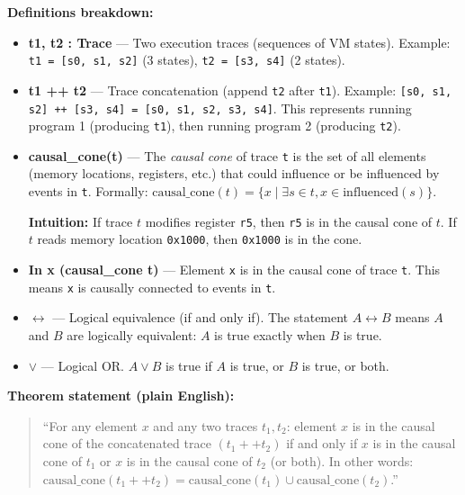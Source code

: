 \textbf{Definitions breakdown:}
\begin{itemize}
    \item \textbf{t1, t2 : Trace} — Two execution traces (sequences of VM states). Example: \texttt{t1 = [s0, s1, s2]} (3 states), \texttt{t2 = [s3, s4]} (2 states).
    
    \item \textbf{t1 ++ t2} — Trace concatenation (append \texttt{t2} after \texttt{t1}). Example: \texttt{[s0, s1, s2] ++ [s3, s4] = [s0, s1, s2, s3, s4]}. This represents running program 1 (producing \texttt{t1}), then running program 2 (producing \texttt{t2}).
    
    \item \textbf{causal\_cone(t)} — The \textit{causal cone} of trace \texttt{t} is the set of all elements (memory locations, registers, etc.) that could influence or be influenced by events in \texttt{t}. Formally: $\text{causal\_cone}(t) = \{x \mid \exists s \in t, x \in \text{influenced}(s)\}$.
    
    \textbf{Intuition:} If trace $t$ modifies register \texttt{r5}, then \texttt{r5} is in the causal cone of $t$. If $t$ reads memory location \texttt{0x1000}, then \texttt{0x1000} is in the cone.
    
    \item \textbf{In x (causal\_cone t)} — Element \texttt{x} is in the causal cone of trace \texttt{t}. This means \texttt{x} is causally connected to events in \texttt{t}.
    
    \item \textbf{$\leftrightarrow$} — Logical equivalence (if and only if). The statement $A \leftrightarrow B$ means $A$ and $B$ are logically equivalent: $A$ is true exactly when $B$ is true.
    
    \item \textbf{$\vee$} — Logical OR. $A \vee B$ is true if $A$ is true, or $B$ is true, or both.
\end{itemize}

\textbf{Theorem statement (plain English):}
\begin{quote}
``For any element $x$ and any two traces $t_1, t_2$: element $x$ is in the causal cone of the concatenated trace $(t_1 ++ t_2)$ if and only if $x$ is in the causal cone of $t_1$ or $x$ is in the causal cone of $t_2$ (or both). In other words: $\text{causal\_cone}(t_1 ++ t_2) = \text{causal\_cone}(t_1) \cup \text{causal\_cone}(t_2)$.''
\end{quote}

